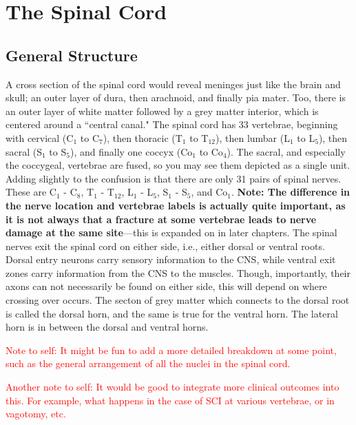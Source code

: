 \documentclass[12pt]{report}
\begin{document}
\chapter{The Spinal Cord}

\section{General Structure}
A cross section of the spinal cord would reveal meninges just like the brain and skull; an outer layer of dura, then arachnoid, and finally pia mater. Too, there is an outer layer of white matter followed by a grey matter interior, which is centered around a ``central canal." The spinal cord has 33 vertebrae, beginning with cervical (C$_1$ to C$_7$), then thoracic (T$_1$ to T$_{12}$), then lumbar (L$_1$ to L$_5$), then sacral (S$_1$ to S$_5$), and finally one coccyx (Co$_1$ to Co$_4$). The sacral, and especially the coccygeal, vertebrae are fused, so you may see them depicted as a single unit. Adding slightly to the confusion is that there are only 31 pairs of spinal nerves. These are C$_1$ - C$_8$, T$_1$ - T$_{12}$, L$_1$ - L$_5$, S$_1$ - S$_5$, and Co$_1$. \textbf{Note: The difference in the nerve location and vertebrae labels is actually quite important, as it is not always that a fracture at some vertebrae leads to nerve damage at the same site}---this is expanded on in later chapters. The spinal nerves exit the spinal cord on either side, i.e., either dorsal or ventral roots. Dorsal entry neurons carry sensory information to the CNS, while ventral exit zones carry information from the CNS to the muscles. Though, importantly, their axons can not necessarily be found on either side, this will depend on where crossing over occurs. The secton of grey matter which connects to the dorsal root is called the dorsal horn, and the same is true for the ventral horn. The lateral horn is in between the dorsal and ventral horns.\newline

\textcolor{red}{Note to self: It might be fun to add a more detailed breakdown at some point, such as the general arrangement of all the nuclei in the spinal cord.}\newline

\textcolor{red}{Another note to self: It would be good to integrate more clinical outcomes into this. For example, what happens in the case of SCI at various vertebrae, or in vagotomy, etc.}
\end{document}
